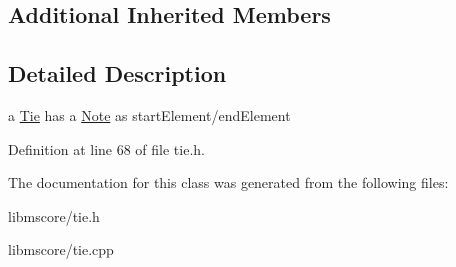 \subsection*{Additional Inherited Members}


\subsection{Detailed Description}
a \hyperlink{class_ms_1_1_tie}{Tie} has a \hyperlink{class_ms_1_1_note}{Note} as start\+Element/end\+Element 

Definition at line 68 of file tie.\+h.



The documentation for this class was generated from the following files\+:\begin{DoxyCompactItemize}
\item 
libmscore/tie.\+h\item 
libmscore/tie.\+cpp\end{DoxyCompactItemize}

